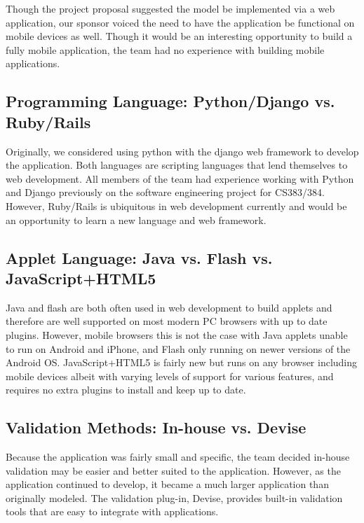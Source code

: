 \documentclass[12pt,english]{article}
\begin{document}
Though the project proposal suggested the model be implemented via
a web application, our sponsor voiced the need to have the application
be functional on mobile devices as well. Though it would be an interesting
opportunity to build a fully mobile application, the team had no experience
with building mobile applications.


\subsection{Programming Language: Python/Django vs. Ruby/Rails}

Originally, we considered using python with the django web framework
to develop the application. Both languages are scripting languages
that lend themselves to web development. All members of the team had
experience working with Python and Django previously on the software
engineering project for CS383/384. However, Ruby/Rails is ubiquitous
in web development currently and would be an opportunity to learn
a new language and web framework.


\subsection{Applet Language: Java vs. Flash vs. JavaScript+HTML5 }

Java and flash are both often used in web development to build applets
and therefore are well supported on most modern PC browsers with up
to date plugins. However, mobile browsers this is not the case with
Java applets unable to run on Android and iPhone, and Flash only running
on newer versions of the Android OS. JavaScript+HTML5 is fairly new
but runs on any browser including mobile devices albeit with varying
levels of support for various features, and requires no extra plugins
to install and keep up to date.


\subsection{Validation Methods: In-house vs. Devise}

Because the application was fairly small and specific, the team decided
in-house validation may be easier and better suited to the application.
However, as the application continued to develop, it became a much
larger application than originally modeled. The validation plug-in,
Devise, provides built-in validation tools that are easy to integrate
with applications.
\end{document}

